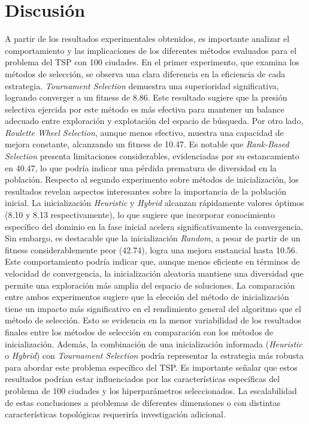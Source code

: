 \documentclass[12pt]{article}
\begin{document}
        \section{Discusión}
            A partir de los resultados experimentales obtenidos, es importante analizar el comportamiento y las implicaciones de los diferentes métodos evaluados para el problema del TSP con 100 ciudades.
            En el primer experimento, que examina los métodos de selección, se observa una clara diferencia en la eficiencia de cada estrategia. \textit{Tournament Selection} demuestra una superioridad significativa, logrando converger a un fitness de 8.86. Este resultado sugiere que la presión selectiva ejercida por este método es más efectiva para mantener un balance adecuado entre exploración y explotación del espacio de búsqueda. Por otro lado, \textit{Roulette Wheel Selection}, aunque menos efectivo, muestra una capacidad de mejora constante, alcanzando un fitness de 10.47. Es notable que \textit{Rank-Based Selection} presenta limitaciones considerables, evidenciadas por su estancamiento en 40.47, lo que podría indicar una pérdida prematura de diversidad en la población.
            Respecto al segundo experimento sobre métodos de inicialización, los resultados revelan aspectos interesantes sobre la importancia de la población inicial. La inicialización \textit{Heuristic} y \textit{Hybrid} alcanzan rápidamente valores óptimos (8.10 y 8.13 respectivamente), lo que sugiere que incorporar conocimiento específico del dominio en la fase inicial acelera significativamente la convergencia. Sin embargo, es destacable que la inicialización \textit{Random}, a pesar de partir de un fitness considerablemente peor (42.74), logra una mejora sustancial hasta 10.56. Este comportamiento podría indicar que, aunque menos eficiente en términos de velocidad de convergencia, la inicialización aleatoria mantiene una diversidad que permite una exploración más amplia del espacio de soluciones.
            La comparación entre ambos experimentos sugiere que la elección del método de inicialización tiene un impacto más significativo en el rendimiento general del algoritmo que el método de selección. Esto se evidencia en la menor variabilidad de los resultados finales entre los métodos de selección en comparación con los métodos de inicialización. Además, la combinación de una inicialización informada (\textit{Heuristic} o \textit{Hybrid}) con \textit{Tournament Selection} podría representar la estrategia más robusta para abordar este problema específico del TSP.
            Es importante señalar que estos resultados podrían estar influenciados por las características específicas del problema de 100 ciudades y los hiperparámetros seleccionados. La escalabilidad de estas conclusiones a problemas de diferentes dimensiones o con distintas características topológicas requeriría investigación adicional. 

    
\end{document}
